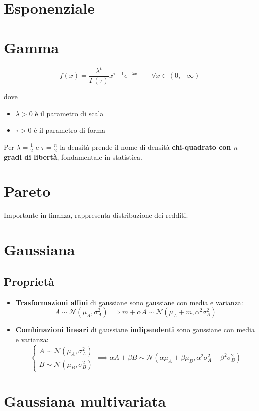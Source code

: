 \documentclass[a4paper,10pt]{article}
\theoremstyle{remark}
\theoremstyle{definition}
\begin{document}
\section{Esponenziale}

\section{Gamma}

$$f(x)=\frac{\lambda^t}{\Gamma(\tau)}x^{\tau -1}e^{-\lambda x} \quad \quad \forall x\in(0,+\infty)$$

dove
\begin{itemize}
    \item $\lambda>0$ è il parametro di scala
    \item $\tau>0$ è il parametro di forma
\end{itemize}
Per $\lambda=\frac{1}{2}$ e $\tau=\frac{n}{2}$ la densità prende il nome di densità \textbf{chi-quadrato con $n$ gradi di libertà}, fondamentale in statistica.

\section{Pareto}
Importante in finanza, rappresenta distribuzione dei redditi.

\section{Gaussiana}
\subsection*{Proprietà}
\begin{itemize}
    \item \textbf{Trasformazioni affini} di gaussiane sono gaussiane con media e varianza:
    $$A\sim \mathcal{N}(\mu_A,\sigma_A^2) \implies  m+\alpha A \sim  \mathcal{N}(\mu_A+m,\alpha^2\sigma_A^2) $$
    \item \textbf{Combinazioni lineari} di gaussiane \textbf{indipendenti} sono gaussiane con media e varianza:
    $$
    \begin{cases}
        A\sim \mathcal{N}(\mu_A,\sigma_A^2) \\
        B\sim \mathcal{N}(\mu_B,\sigma_B^2)
    \end{cases}
    \implies \alpha A +\beta B \sim \mathcal{N}(\alpha\mu_A+\beta\mu_B,\alpha^2\sigma_A^2+\beta^2\sigma_B^2)$$
\end{itemize}
\section{Gaussiana multivariata}
\end{document}
